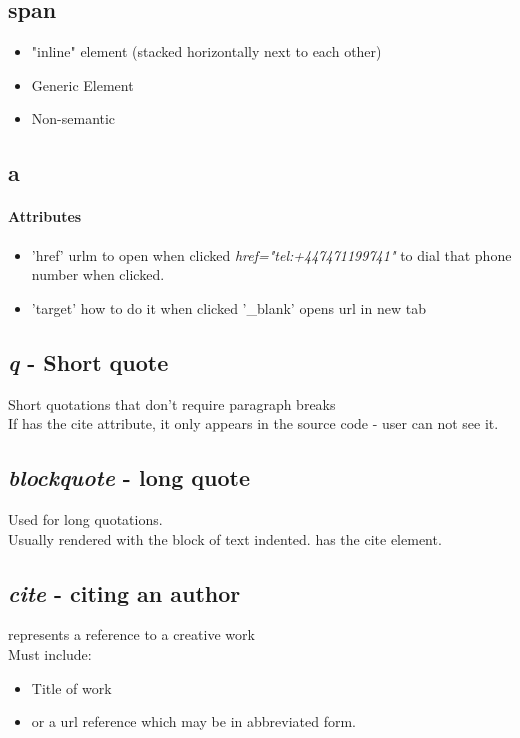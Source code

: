 \documentclass[]{article}
\newcommand{\<}{\guilsinglleft}
\renewcommand{\>}{\guilsinglright}
\renewcommand{\it}[1]{\textit{#1}}
\begin{document}
\subsection{span}
\begin{itemize}
	\item "inline" element (stacked horizontally next to each other)
	\item Generic Element
	\item Non-semantic
\end{itemize}

\subsection{a}
\paragraph{Attributes}
\begin{itemize}
	\item 'href' urlm to open when clicked
	\subitem \it{href="tel:+447471199741"} to dial that phone number when clicked.
	
	\item 'target' how to do it when clicked
	\subitem '\_blank' opens url in new tab 
\end{itemize}

\subsection{\it{q} - Short quote}
Short quotations that don't require paragraph breaks
\\
If has the cite attribute, it only appears in the source code - user can not see it.


\subsection{\it{blockquote} - long quote}
Used for long quotations.
\\
Usually rendered with the block of text indented.
has the cite element.

\subsection{\it{cite} - citing an author}
 represents a reference to a creative work
\\
Must include:
\begin{itemize}
	\item Title of work  
	\item or a url reference which may be in abbreviated form.
\end{itemize}
\end{document}
